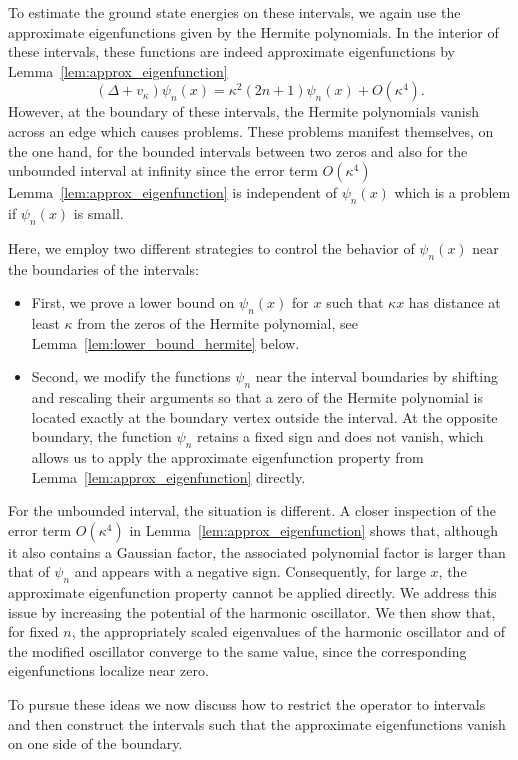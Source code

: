 \documentclass[12pt, reqno]{amsart}
\theoremstyle{definition}
\numberwithin{equation}{section}
\begin{document}
To estimate the ground state energies on these intervals, we again use the approximate eigenfunctions given by the Hermite polynomials. In the interior of these intervals, these functions are indeed approximate eigenfunctions by Lemma~\ref{lem:approx_eigenfunction}
$$(\Delta+v_\kappa)\psi_{n}(x)= \kappa^2 \left(2n+1\right)   \psi_{n}(x)+O(\kappa^4 ) .$$ 
However, at the boundary of these intervals, the Hermite polynomials vanish across an edge which causes problems. These problems manifest themselves, on the one hand, for the bounded intervals between two zeros and also for the unbounded interval at infinity since the error term $O(\kappa^4)$ Lemma~\ref{lem:approx_eigenfunction} is independent of $\psi_n(x)$ which is a problem if $\psi_n(x)$ is small. 



Here, we employ two different strategies to control the behavior of $\psi_n(x)$ near the boundaries of the intervals:
\begin{itemize}
    \item First, we prove a lower bound on $\psi_n(x)$ for $x$ {such that $\kappa x$ has}  distance at least $\kappa$ from the zeros of the Hermite polynomial, see Lemma~\ref{lem:lower_bound_hermite} below.
    \item Second, we modify the functions $\psi_n$ near the interval boundaries by shifting and rescaling their arguments so that a zero of the Hermite polynomial is located exactly at the boundary vertex outside the interval. At the opposite boundary, the function $\psi_n$ retains a fixed sign and does not vanish, which allows us to apply the approximate eigenfunction property from Lemma~\ref{lem:approx_eigenfunction} directly.
\end{itemize}
For the unbounded interval, the situation is different. A closer inspection of the error term $O(\kappa^4)$ in Lemma~\ref{lem:approx_eigenfunction} shows that, although it also contains a Gaussian factor, the associated polynomial factor is larger than that of $\psi_n$ and appears with a negative sign. Consequently, for large $x$, the approximate eigenfunction property cannot be applied directly. We address this issue by increasing the potential of the harmonic oscillator. We then show that, for fixed $n$, the appropriately scaled eigenvalues of the harmonic oscillator and of the modified oscillator converge to the same value, since the corresponding eigenfunctions localize near zero.



To pursue these ideas we now discuss how to restrict the operator to intervals and then construct the intervals such that the approximate eigenfunctions vanish on one side of the boundary.
\end{document}
